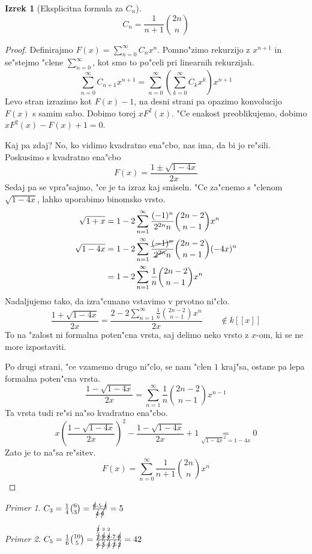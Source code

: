 \documentclass[a4paper,12pt]{article}
\theoremstyle{definition}
\newtheorem{theorem}[counter]{Izrek}
\theoremstyle{remark}
\newtheorem*{ex}{Primer}
\begin{document}
\begin{theorem}[Eksplicitna formula za $C_n$]
	\[C_n = \frac{1}{n + 1} \binom{2n}{n}\]
\end{theorem}
\begin{proof}
	Definirajmo $F(x) = \sum_{n = 0}^{\infty} C_n x^n$.
	Pomno"zimo rekurzijo z $x^{n + 1}$ in se"stejmo "clene $\sum_{n = 0}^{\infty}$, kot smo to po"celi pri linearnih rekurzijah.
	\[\sum_{n = 0}^{\infty} C_{n + 1} x^{n + 1} = \sum_{n = 0}^{\infty} (\sum_{k = 0}^{\infty} C_k x^k) x^{n + 1}\]
	Levo stran izrazimo kot $F(x) - 1$, na desni strani pa opazimo konvolucijo $F(x)$ s samim sabo. Dobimo torej $x F^2(x)$. "Ce enakost preoblikujemo, dobimo $x F^2(x) - F(x) + 1 = 0$.
	
	Kaj pa zdaj? No, ko vidimo kvadratno ena"cbo, nas ima, da bi jo re"sili. Poskusimo s kvadratno ena"cbo
	\[F(x) = \frac{1 \pm \sqrt{1 - 4x}}{2x}\]
	Sedaj pa se vpra"sajmo, "ce je ta izraz kaj smiseln. "Ce za"cnemo s "clenom $\sqrt{1-4x}$, lahko uporabimo binomsko vrsto.
	\begin{align*}
		\sqrt{1 + x} &= 1 - 2\sum_{n = 1}^{\infty} \frac{(-1)^n}{2^{2n}n} \binom{2n - 2}{n - 1} x^n\\
		\sqrt{1 - 4x} &= 1 - 2\sum_{n = 1}^{\infty} \frac{\cancel{(-1)^n}}{\cancel{2^{2n}}n} \binom{2n - 2}{n - 1} (-4x)^n\\
		&= 1 - 2\sum_{n = 1}^{\infty} \frac{1}{n} \binom{2n - 2}{n - 1} x^n
	\end{align*}
	Nadaljujemo tako, da izra"cunano vstavimo v prvotno ni"clo.
	\[\frac{1 + \sqrt{1 - 4x}}{2x} = \frac{2 - 2\sum_{n = 1}^{\infty} \frac{1}{n} \binom{2n - 2}{n - 1} x^n}{2x} \qquad \notin k[[x]] \]
	To na "zalost ni formalna poten"cna vrsta, saj delimo neko vrsto z $x$-om, ki se ne more izpostaviti.
	
	Po drugi strani, "ce vzamemo drugo ni"clo, se nam "clen $1$ kraj"sa, ostane pa lepa formalna poten"cna vrsta.
	\[\frac{1 - \sqrt{1 - 4x}}{2x} = \sum_{n = 1}^{\infty} \frac{1}{n} \binom{2n - 2}{n - 1} x^{n - 1}\]
	Ta vrsta tudi re"si na"so kvadratno ena"cbo.
	\[x (\frac{1 - \sqrt{1 - 4x}}{2x})^2 - \frac{1 - \sqrt{1 - 4x}}{2x} + 1 \underset{\sqrt{1 - 4x}^2 = 1 - 4x}{=} 0\]
	Zato je to na"sa re"sitev.
	\[F(x) = \sum_{n = 0}^{\infty} \frac{1}{n + 1} \binom{2n}{n} x^n\]
\end{proof}

\begin{ex}
	$C_3 = \frac{1}{4} \binom{6}{3} = \frac{\cancel{6} \cdot 5 \cdot \cancel{4}}{\cancel{4} \cdot \cancel{6}} = 5$	
\end{ex}
\begin{ex}
	$C_5 = \frac{1}{6} \binom{10}{5} = \frac{\overset{\cancel{2}}{\cancel{2}} \cdot \overset{3}{\cancel{9}} \cdot \overset{2}{\cancel{8}} \cdot 7 \cdot \cancel{6}}{\cancel{6} \cdot \cancel{5} \cdot \cancel{4} \cdot \cancel{3} \cdot \cancel{2}} = 42$
\end{ex}
\end{document}

